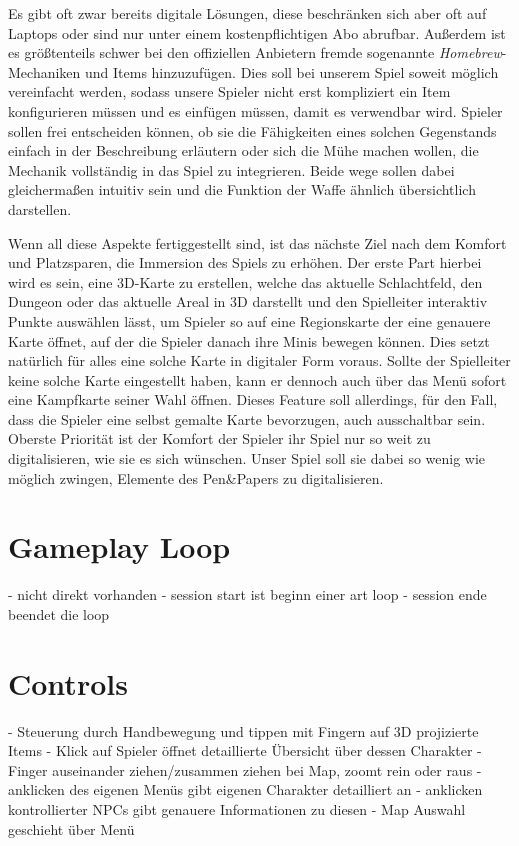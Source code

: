 \documentclass[11pt]{article}
\begin{document}
    Es gibt oft zwar bereits digitale Lösungen, diese beschränken sich aber oft auf Laptops
    oder sind nur unter einem kostenpflichtigen Abo abrufbar.
    Außerdem ist es größtenteils schwer bei den offiziellen Anbietern fremde sogenannte \textit{Homebrew}-Mechaniken
    und Items hinzuzufügen.
    Dies soll bei unserem Spiel soweit möglich vereinfacht werden, sodass unsere Spieler nicht erst kompliziert
    ein Item konfigurieren müssen und es einfügen müssen, damit es verwendbar wird.
    Spieler sollen frei entscheiden können, ob sie die Fähigkeiten eines solchen Gegenstands einfach
    in der Beschreibung erläutern oder sich die Mühe machen wollen, die Mechanik vollständig in das
    Spiel zu integrieren.
    Beide wege sollen dabei gleichermaßen intuitiv sein und die Funktion der Waffe ähnlich
    übersichtlich darstellen.\newblock

    Wenn all diese Aspekte fertiggestellt sind, ist das nächste Ziel nach dem Komfort und Platzsparen, die Immersion des
    Spiels zu erhöhen.\n
    Der erste Part hierbei wird es sein, eine 3D-Karte zu erstellen, welche das aktuelle Schlachtfeld, den Dungeon oder
    das aktuelle Areal in 3D darstellt und den Spielleiter interaktiv Punkte auswählen lässt, um Spieler so auf eine
    Regionskarte der eine genauere Karte öffnet, auf der die Spieler danach ihre Minis bewegen können.
    Dies setzt natürlich für alles eine solche Karte in digitaler Form voraus.
    Sollte der Spielleiter keine solche Karte eingestellt haben, kann er dennoch auch über das Menü sofort
    eine Kampfkarte seiner Wahl öffnen.
    Dieses Feature soll allerdings, für den Fall, dass die Spieler eine selbst gemalte Karte bevorzugen, auch
    ausschaltbar sein.
    Oberste Priorität ist der Komfort der Spieler ihr Spiel nur so weit zu digitalisieren, wie sie es sich wünschen.
    Unser Spiel soll sie dabei so wenig wie möglich zwingen, Elemente des Pen\&Papers zu digitalisieren.\n

    \section{Gameplay Loop}
    - nicht direkt vorhanden
    - session start ist beginn einer art loop
    - session ende beendet die loop

    \section{Controls}
    - Steuerung durch Handbewegung und tippen mit Fingern auf 3D projizierte Items
    - Klick auf Spieler öffnet detaillierte Übersicht über dessen Charakter
    - Finger auseinander ziehen/zusammen ziehen bei Map, zoomt rein oder raus
    - anklicken des eigenen Menüs gibt eigenen Charakter detailliert an
    - anklicken kontrollierter NPCs gibt genauere Informationen zu diesen
    - Map Auswahl geschieht über Menü
\end{document}
